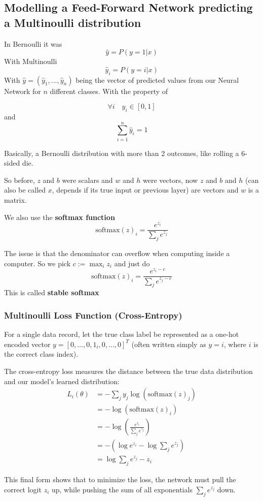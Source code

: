 \documentclass{article}
\begin{document}
\subsection{Modelling a Feed-Forward Network predicting a Multinoulli distribution}
In Bernoulli it was
\[\hat{y} = P(y= 1|x)\]
With Multinoulli
\[\hat{y}_i = P(y=i | x)\]
With $\hat{y} = (\hat{y}_1,...,\hat{y}_n)$ being the vector of predicted values from our Neural Network for $n$ different classes. With the property of

\[\forall i \quad \hat{y}_i \in [0,1]\]
and
\[\sum_{i=1}^n \hat{y}_i = 1\]

Basically, a Bernoulli distribution with more than 2 outcomes, like rolling a 6-sided die.


So before, $z$ and $b$ were scalars and $w$ and $h$ were vectors, now $z$ and $b$ and $h$ (can also be called $x$, depends if its true input or previous layer) are vectors  and $w$ is a matrix.

We also use the \textbf{softmax function}
\[\text{softmax}(z)_i = \frac{e^{z_i}}{\sum_j e^{z_j}}\]

The issue is that the denominator can overflow when computing inside a computer. So we pick $c := \max_i z_i$ and just do
\[\text{softmax}(z)_i = \frac{e^{z_i - c}}{\sum_j e^{z_j-c}}\]
This is called \textbf{stable softmax}

\subsubsection{Multinoulli Loss Function (Cross-Entropy)}
For a single data record, let the true class label be represented as a one-hot encoded vector $y = [0, \dots, 0, 1_i, 0, \dots, 0]^T$ (often written simply as $y = i$, where $i$ is the correct class index). 

The cross-entropy loss measures the distance between the true data distribution and our model's learned distribution:
\begin{align*}
L_i(\theta) &= -\sum_{j} y_j \log(\text{softmax}(z)_j) \\
&= -\log(\text{softmax}(z)_i) \\
&= -\log \left( \frac{e^{z_i}}{\sum_j e^{z_j}} \right) \\
&= - \left( \log e^{z_i} - \log \sum_j e^{z_j} \right) \\
&= \log \sum_j e^{z_j} - z_i
\end{align*}

This final form shows that to minimize the loss, the network must pull the correct logit $z_i$ up, while pushing the sum of all exponentials $\sum_j e^{z_j}$ down.
\end{document}
